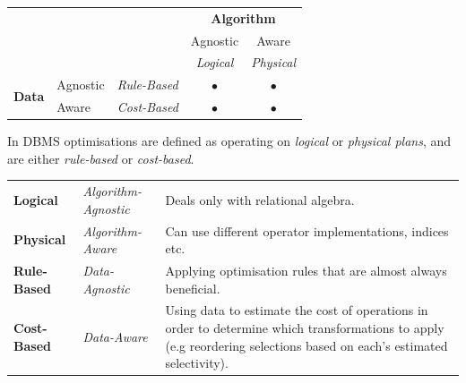 \begin{center}
    \begin{tabular}{l l l c c}
                                       &          &                     & \multicolumn{2}{c}{\textbf{Algorithm}}                     \\
                                       &          &                     & Agnostic                               & Aware             \\
                                       &          &                     & \textit{Logical}                       & \textit{Physical} \\
        \multirow{2}{*}{\textbf{Data}} & Agnostic & \textit{Rule-Based} & $\bullet$                              & $\bullet$         \\
                                       & Aware    & \textit{Cost-Based} & $\bullet$                              & $\bullet$         \\
    \end{tabular}
\end{center}
In DBMS optimisations are defined as operating on \textit{logical} or \textit{physical plans}, and are either \textit{rule-based} or \textit{cost-based}.
\begin{center}
    \begin{tabular}{l l p{}}
        \textbf{Logical}    & \textit{Algorithm-Agnostic} & Deals only with relational algebra.                                                                                                                                   \\
        \textbf{Physical}   & \textit{Algorithm-Aware}    & Can use different operator implementations, indices etc.                                                                                                              \\
        \textbf{Rule-Based} & \textit{Data-Agnostic}      & Applying optimisation rules that are almost always beneficial.                                                                                                        \\
        \textbf{Cost-Based} & \textit{Data-Aware}         & Using data to estimate the cost of operations in order to determine which transformations to apply (e.g reordering selections based on each's estimated selectivity). \\
    \end{tabular}
\end{center}

